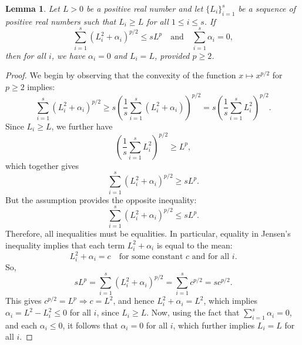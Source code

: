 \documentclass[final,1p,times]{elsarticle}
\newtheorem{lem}[thm]{Lemma}
\begin{document}
\begin{lem}\label{lemma4point2}
Let \( L > 0 \) be a positive real number and let \( \{L_i\}_{i=1}^s \) be a sequence of positive real numbers such that \( L_i \geq L \) for all \( 1 \leq i \leq s \). If
\[
\sum_{i=1}^s \left(L_i^2 + \alpha_i \right)^{p/2} \leq sL^p \quad \text{and} \quad \sum_{i=1}^s \alpha_i = 0,
\]
then for all \( i \), we have \( \alpha_i = 0 \) and \( L_i = L \), provided \( p \geq 2 \).
\end{lem}

\begin{proof}
We begin by observing that the convexity of the function \( x \mapsto x^{p/2} \) for \( p \geq 2 \) implies:
\[
\sum_{i=1}^s \left( L_i^2 + \alpha_i \right)^{p/2} \geq s \left( \frac{1}{s} \sum_{i=1}^s (L_i^2 + \alpha_i) \right)^{p/2} = s \left( \frac{1}{s} \sum_{i=1}^s L_i^2 \right)^{p/2}.
\]
Since \( L_i \geq L \), we further have
\[
\left( \frac{1}{s} \sum_{i=1}^s L_i^2 \right)^{p/2} \geq L^p,
\]
which together gives
\[
\sum_{i=1}^s \left( L_i^2 + \alpha_i \right)^{p/2} \geq sL^p.
\]
But the assumption provides the opposite inequality:
\[
\sum_{i=1}^s \left( L_i^2 + \alpha_i \right)^{p/2} \leq sL^p.
\]
Therefore, all inequalities must be equalities. In particular, equality in Jensen's inequality implies that each term \( L_i^2 + \alpha_i \) is equal to the mean:
\[
L_i^2 + \alpha_i = c \quad \text{for some constant } c \text{ and for all } i.
\]
So,
\[
sL^p = \sum_{i=1}^s \left( L_i^2 + \alpha_i \right)^{p/2} = \sum_{i=1}^s c^{p/2} = sc^{p/2}.
\]
This gives \( c^{p/2} = L^p \Rightarrow c = L^2 \), and hence \( L_i^2 + \alpha_i = L^2 \), which implies \( \alpha_i = L^2 - L_i^2 \leq 0 \) for all \( i \), since \( L_i \geq L \). Now, using the fact that \( \sum_{i=1}^s \alpha_i = 0 \), and each \( \alpha_i \leq 0 \), it follows that \( \alpha_i = 0 \) for all \( i \), which further implies \( L_i = L \) for all \( i \).
\end{proof}
\end{document}
